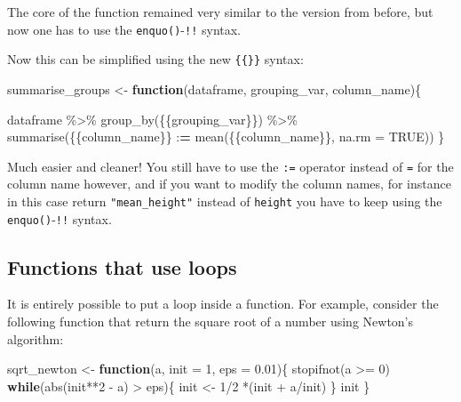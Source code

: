 \documentclass[
]{article}
\newenvironment{Shaded}{\begin{snugshade}}{\end{snugshade}}
\newcommand{\AttributeTok}[1]{\textcolor[rgb]{0.77,0.63,0.00}{#1}}
\newcommand{\ConstantTok}[1]{\textcolor[rgb]{0.00,0.00,0.00}{#1}}
\newcommand{\ControlFlowTok}[1]{\textcolor[rgb]{0.13,0.29,0.53}{\textbf{#1}}}
\newcommand{\DecValTok}[1]{\textcolor[rgb]{0.00,0.00,0.81}{#1}}
\newcommand{\ErrorTok}[1]{\textcolor[rgb]{0.64,0.00,0.00}{\textbf{#1}}}
\newcommand{\FloatTok}[1]{\textcolor[rgb]{0.00,0.00,0.81}{#1}}
\newcommand{\FunctionTok}[1]{\textcolor[rgb]{0.00,0.00,0.00}{#1}}
\newcommand{\NormalTok}[1]{#1}
\newcommand{\OtherTok}[1]{\textcolor[rgb]{0.56,0.35,0.01}{#1}}
\newcommand{\SpecialCharTok}[1]{\textcolor[rgb]{0.00,0.00,0.00}{#1}}
\begin{document}
The core of the function remained very similar to the version from before, but now one has to
use the \texttt{enquo()}-\texttt{!!} syntax.

Now this can be simplified using the new \texttt{\{\{\}\}} syntax:

\begin{Shaded}
\begin{Highlighting}[]
\NormalTok{summarise\_groups }\OtherTok{\textless{}{-}} \ControlFlowTok{function}\NormalTok{(dataframe, grouping\_var, column\_name)\{}

\NormalTok{  dataframe }\SpecialCharTok{\%\textgreater{}\%}
    \FunctionTok{group\_by}\NormalTok{(\{\{grouping\_var\}\}) }\SpecialCharTok{\%\textgreater{}\%}  
    \FunctionTok{summarise}\NormalTok{(\{\{column\_name\}\} }\SpecialCharTok{:}\ErrorTok{=} \FunctionTok{mean}\NormalTok{(\{\{column\_name\}\}, }\AttributeTok{na.rm =} \ConstantTok{TRUE}\NormalTok{))}
\NormalTok{\}}
\end{Highlighting}
\end{Shaded}

Much easier and cleaner! You still have to use the \texttt{:=} operator instead of \texttt{=} for the column name
however, and if you want to modify the column names, for instance in this
case return \texttt{"mean\_height"} instead of \texttt{height} you have to keep using the \texttt{enquo()}-\texttt{!!} syntax.

\hypertarget{functions-that-use-loops}{%
\subsection{Functions that use loops}\label{functions-that-use-loops}}

It is entirely possible to put a loop inside a function. For example, consider the following
function that return the square root of a number using Newton's algorithm:

\begin{Shaded}
\begin{Highlighting}[]
\NormalTok{sqrt\_newton }\OtherTok{\textless{}{-}} \ControlFlowTok{function}\NormalTok{(a, }\AttributeTok{init =} \DecValTok{1}\NormalTok{, }\AttributeTok{eps =} \FloatTok{0.01}\NormalTok{)\{}
    \FunctionTok{stopifnot}\NormalTok{(a }\SpecialCharTok{\textgreater{}=} \DecValTok{0}\NormalTok{)}
    \ControlFlowTok{while}\NormalTok{(}\FunctionTok{abs}\NormalTok{(init}\SpecialCharTok{**}\DecValTok{2} \SpecialCharTok{{-}}\NormalTok{ a) }\SpecialCharTok{\textgreater{}}\NormalTok{ eps)\{}
\NormalTok{        init }\OtherTok{\textless{}{-}} \DecValTok{1}\SpecialCharTok{/}\DecValTok{2} \SpecialCharTok{*}\NormalTok{(init }\SpecialCharTok{+}\NormalTok{ a}\SpecialCharTok{/}\NormalTok{init)}
\NormalTok{    \}}
\NormalTok{    init}
\NormalTok{\}}
\end{Highlighting}
\end{Shaded}
\end{document}
